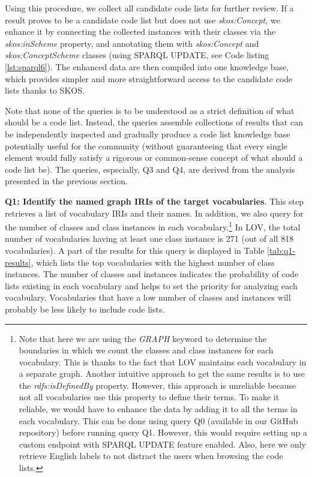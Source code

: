 Using this procedure, we collect all candidate code lists for further review. If a result proves to be a candidate code list but does not use \emph{skos:Concept}, we enhance it by connecting the collected instances with their classes via the \emph{skos:inScheme} property, and annotating them with \emph{skos:Concept} and \emph{skos:ConceptScheme} classes (using SPARQL UPDATE, see Code listing \ref{lst:sparql6}). The enhanced data are then compiled into one knowledge base, which provides simpler and more straightforward access to the candidate code lists thanks to SKOS.



Note that none of the queries is to be understood as a strict definition of what should be a code list.
Instead, the queries assemble collections of results that can be independently inspected and gradually produce a code list knowledge base potentially useful for the community (without guaranteeing that every single element would fully satisfy a rigorous or common-sense concept of what should a code list be).
The queries, especially, Q3 and Q4, are derived from the analysis presented in the previous section. 

\medskip
\medskip
\noindent\textbf{Q1: Identify the named graph IRIs of the target vocabularies}. This step retrieves a list of vocabulary IRIs and their names. In addition, we also query for the number of classes and class instances in each vocabulary.\footnote{Note that here we are using the \textit{GRAPH} keyword to determine the boundaries in which we count the classes and class instances for each vocabulary. This is thanks to the fact that LOV maintains each vocabulary in a separate graph. Another intuitive approach to get the same results is to use the \textit{rdfs:isDefinedBy} property. However, this approach is unreliable because not all vocabularies use this property to define their terms. To make it reliable, we would have to enhance the data by adding it to all the terms in each vocabulary. This can be done using
query Q0 (available in our GitHub repository) before running query Q1. However, this would require setting up a custom endpoint with SPARQL UPDATE feature enabled. Also, here we only retrieve English labels to not distract the users when browsing the code lists.} In LOV, the total number of vocabularies having at least one class instance is 271 (out of all 818 vocabularies). A part of the results for this query is displayed in Table \ref{tab:q1-results}, which lists the top vocabularies with the highest number of class instances. The number of classes and instances indicates the probability of code lists existing in each vocabulary and helps to set the priority for analyzing each vocabulary. Vocabularies that have a low number of classes and instances will probably be less likely to include code lists. %

